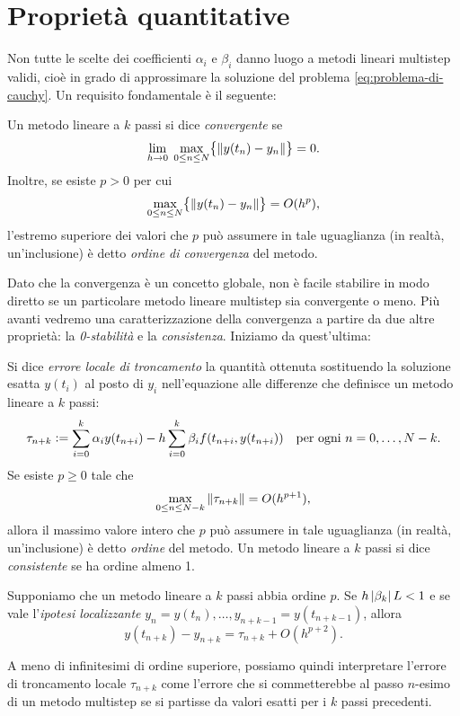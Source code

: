 \section{Proprietà quantitative}
Non tutte le scelte dei coefficienti $\alpha_i$ e $\beta_i$
danno luogo a metodi lineari multistep validi, cioè in grado
di approssimare la soluzione del problema \eqref{eq:problema-di-cauchy}.
Un requisito fondamentale è il seguente:
\begin{defi}
Un metodo lineare a $k$ passi si dice \emph{convergente} se
\[
\lim_{h \to 0} \; \max_{0 \leq n \leq N} \bigl\{ \left\lVert y(t_n)-y_n\right\rVert \bigr\} = 0.
\]
Inoltre, se esiste $p > 0$ per cui
\[
\max_{0 \leq n \leq N} \bigl\{ \left\lVert y(t_n)-y_n\right\rVert \bigr\} = O(h^p),
\]
l'estremo superiore dei valori che $p$ può assumere in tale uguaglianza
(in realtà, un'inclusione) è detto \emph{ordine di convergenza} del metodo.
\end{defi}

Dato che la convergenza è un concetto globale,
non è facile stabilire in modo diretto se un particolare
metodo lineare multistep sia convergente o meno.
Più avanti vedremo una caratterizzazione della convergenza
a partire da due altre proprietà: la \emph{0-stabilità} e la \emph{consistenza}.
Iniziamo da quest'ultima:
\begin{defi}
Si dice \emph{errore locale di troncamento} la quantità ottenuta
sostituendo la soluzione esatta $y(t_i)$ al posto di $y_i$ nell'equazione
alle differenze che definisce un metodo lineare a $k$ passi:
\begin{equation} \label{eq:errore-locale-di-troncamento}
\tau_{n+k}
\vcentcolon= \sum_{i=0}^k \alpha_i y(t_{n+i})
 - h \sum_{i=0}^k \beta_i f(t_{n+i},y(t_{n+i}))
\quad \text{per ogni $n=0,\dots,N-k$}.
\end{equation}
Se esiste $p \geq 0$ tale che
\[
\max_{0 \leq n \leq N-k} \left\lVert\tau_{n+k}\right\rVert = O(h^{p+1}),
\]
allora il massimo valore intero che $p$ può assumere in tale uguaglianza
(in realtà, un'inclusione) è detto \emph{ordine} del metodo.
Un metodo lineare a $k$ passi si dice \emph{consistente} se ha ordine
almeno 1.
\end{defi}
\begin{teor}
Supponiamo che un metodo lineare a $k$ passi abbia ordine $p$.
Se $h \left\lvert\beta_k\right\rvert L < 1$ e se vale l'\emph{ipotesi localizzante}
$y_n = y(t_n), \dots, y_{n+k-1} = y(t_{n+k-1})$, allora
\[
y(t_{n+k}) - y_{n+k} = \tau_{n+k} + O(h^{p+2}).
\]
\end{teor}
\noindent A meno di infinitesimi di ordine superiore, possiamo
quindi interpretare l'errore di troncamento locale $\tau_{n+k}$
come l'errore che si commetterebbe al passo $n$-esimo di un metodo multistep
se si partisse da valori esatti per i $k$ passi precedenti.


